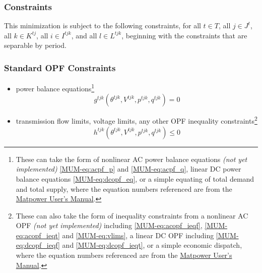 \documentclass[12pt]{article}
\newcommand{\mpver}[0]{8.1}
\newcommand{\matpower}[0]{{\sc Matpower}}
\newcommand{\mumurl}[0]{https://matpower.org/docs/MATPOWER-manual-\mpver.pdf}
\newcommand{\mum}[0]{\href{\mumurl}{\matpower{} User's Manual}}
\numberwithin{equation}{section}
\numberwithin{table}{section}
\numberwithin{figure}{section}
\begin{document}
\subsubsection{Constraints}

This minimization is subject to the following constraints, for all $t \in T$, all $j \in J^t$, all $k \in K^{tj}$, all $i \in I^{tjk}$, and all $l \in L^{tjk}$, beginning with the constraints that are separable by period.

\subsubsection*{Standard OPF Constraints}

\begin{itemize}
\item[--] power balance equations\footnote{These can take the form of nonlinear AC power balance equations \emph{(not yet implemented)} \eqref{MUM-eq:acpf_p} and \eqref{MUM-eq:acpf_q}, linear DC power balance equations \eqref{MUM-eq:dcopf_eq}, or a simple equating of total demand and total supply, where the equation numbers referenced are from the \mum{}.}
\begin{equation}
  g^{tjk}(\theta^{tjk},V^{tjk},p^{tjk},q^{tjk}) = 0 \label{eq:firstopf}
\end{equation}
\item[--] transmission flow limits, voltage limits, any other OPF inequality constraints\footnote{These can also take the form of inequality constraints from a nonlinear AC OPF \emph{(not yet implemented)} including \eqref{MUM-eq:acopf_ieqf}, \eqref{MUM-eq:acopf_ieqt} and \eqref{MUM-eq:vlims}, a linear DC OPF including \eqref{MUM-eq:dcopf_ieqf} and \eqref{MUM-eq:dcopf_ieqt}, or a simple economic dispatch, where the equation numbers referenced are from the \mum{}.}
\begin{equation}
  h^{tjk}(\theta^{tjk},V^{tjk},p^{tjk},q^{tjk}) \leq 0
\end{equation}
\end{itemize}
\end{document}
